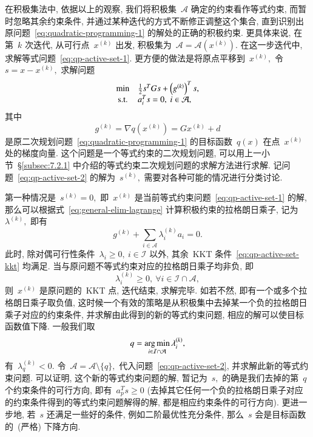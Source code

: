 在积极集法中, 依据以上的观察, 我们将积极集~$\mathcal{A}$ 确定的约束看作等式约束, 而暂时忽略其余约束条件, 并通过某种迭代的方式不断修正调整这个集合, 直到识别出原问题~\eqref{eq:quadratic-programming-1} 的解处的正确的积极约束. 更具体来说, 在第~$k$ 次迭代, 从可行点~${x}^{(k)}$ 出发,
积极集为~$\mathcal{A} = \mathcal{A}({x}^{(k)}).$ 在这一步迭代中,
求解等式问题~\eqref{eq:qp-active-set-1}. 更方便的做法是将原点平移到~${x}^{(k)},$ 令~${s} = {x} - {x}^{(k)},$ 求解问题
\begin{equation}
\label{eq:qp-active-set-2}
\begin{array}{cl}
\min & \frac{1}{2} {s}^T G {s} + \left( {g}^{(k)} \right)^T {s}, \\
{\rm s.t.} & {a}_i^T {s} = 0, ~ i \in \mathcal{A},
\end{array}
\end{equation}
其中
\begin{equation*}
{g}^{(k)} = \nabla q({x}^{(k)}) = G {x}^{(k)} + {d}
\end{equation*}
是原二次规划问题~\eqref{eq:quadratic-programming-1} 的目标函数~$q({x})$ 在点~${x}^{(k)}$ 处的梯度向量.  这个问题是一个等式约束的二次规划问题, 可以用上一小节~\S\ref{subsec:7.2.1} 中介绍的等式约束二次规划问题的求解方法进行求解. 记问题~\eqref{eq:qp-active-set-2} 的解为~${s}^{(k)},$ 需要对各种可能的情况进行分类讨论.

第一种情况是~${s}^{(k)} = {0},$ 即~${x}^{(k)}$ 是当前等式约束问题~\eqref{eq:qp-active-set-1} 的解, 那么可以根据式~\eqref{eq:general-elim-lagrange} 计算积极约束的拉格朗日乘子, 记为~${\lambda}^{(k)},$  即有
\begin{equation}
\label{eq:qp-active-set-lambda}
{g}^{(k)} + \sum\limits_{i \in \mathcal{A}} \lambda_i^{(k)} a_i = 0.
\end{equation}
此时, 除对偶可行性条件~$\lambda_i \geqslant 0, ~ i \in \mathcal{I}$ 以外, 其余~KKT
条件~\eqref{eq:qp-active-set-kkt} 均满足. 当与原问题不等式约束对应的拉格朗日乘子均非负, 即
\begin{equation*}
\lambda_i^{(k)} \geqslant 0, ~ \forall i \in \mathcal{I} \cap \mathcal{A},
\end{equation*}
则~$x^{(k)}$ 是原问题的~KKT 点, 迭代结束, 求解完毕. 如若不然, 即有一个或多个拉格朗日乘子取负值, 
这时候一个有效的策略是从积极集中去掉某一个负的拉格朗日乘子对应的约束条件, 并求解由此得到的新的等式约束问题, 相应的解可以使目标函数值下降. 一般我们取
\begin{equation}
\label{eq:qp-active-set-inactive-index}
q = \operatorname*{arg\,min}_{i \in \mathcal{I} \cap \mathcal{A}} \lambda_i^{(k)},
\end{equation}
有~$\lambda_q^{(k)} < 0.$ 令~$\mathcal{A} = \mathcal{A} \setminus \{ q \},$
代入问题~\eqref{eq:qp-active-set-2}, 并求解此新的等式约束问题. 可以证明, 这个新的等式约束问题的解, 
暂记为~$s,$ 的确是我们去掉的第~$q$ 个约束条件的可行方向, 即有~$a_p^T s \geqslant 0$ (去掉其它任何一个负的拉格朗日乘子对应的约束条件得到的等式约束问题解得的解, 都是相应约束条件的可行方向). 更进一步地, 若~$s$ 还满足一些好的条件, 例如二阶最优性充分条件, 那么~$s$ 会是目标函数的~(严格) 下降方向.

